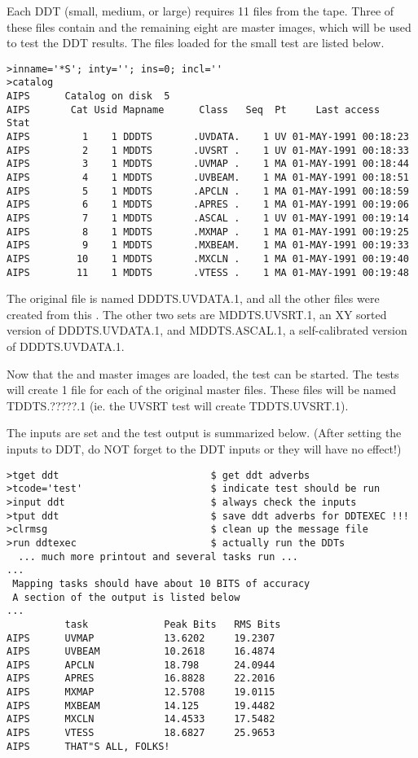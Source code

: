 Each DDT (small, medium, or large) requires 11 files from
the tape.  Three of these files contain \uvdata and the remaining
eight are master images, which will be used to test the DDT results.
The files loaded for the small test are listed below.
\begin{verbatim}
>inname='*S'; inty=''; ins=0; incl=''
>catalog
AIPS      Catalog on disk  5
AIPS       Cat Usid Mapname      Class   Seq  Pt     Last access      Stat
AIPS         1    1 DDDTS       .UVDATA.    1 UV 01-MAY-1991 00:18:23
AIPS         2    1 MDDTS       .UVSRT .    1 UV 01-MAY-1991 00:18:33
AIPS         3    1 MDDTS       .UVMAP .    1 MA 01-MAY-1991 00:18:44
AIPS         4    1 MDDTS       .UVBEAM.    1 MA 01-MAY-1991 00:18:51
AIPS         5    1 MDDTS       .APCLN .    1 MA 01-MAY-1991 00:18:59
AIPS         6    1 MDDTS       .APRES .    1 MA 01-MAY-1991 00:19:06
AIPS         7    1 MDDTS       .ASCAL .    1 UV 01-MAY-1991 00:19:14
AIPS         8    1 MDDTS       .MXMAP .    1 MA 01-MAY-1991 00:19:25
AIPS         9    1 MDDTS       .MXBEAM.    1 MA 01-MAY-1991 00:19:33
AIPS        10    1 MDDTS       .MXCLN .    1 MA 01-MAY-1991 00:19:40
AIPS        11    1 MDDTS       .VTESS .    1 MA 01-MAY-1991 00:19:48
\end{verbatim}
The original \uvdata file is named DDDTS.UVDATA.1, and all the other
files were created from this \uvdata.
The other two \uvdata sets are MDDTS.UVSRT.1, an XY sorted version
of DDDTS.UVDATA.1, and MDDTS.ASCAL.1, a self-calibrated version
of DDDTS.UVDATA.1.

Now that the \uvdata and master images are loaded, the test
can be started.  The tests will create 1 file for each of the
original master files.  These files will be named TDDTS.?????.1
(ie. the UVSRT test will create TDDTS.UVSRT.1).

\clearpage

The inputs are set and the test output is summarized below.
(After setting the inputs to DDT, do NOT forget to 
the DDT inputs or they will have no effect!)

\begin{verbatim}
>tget ddt                          $ get ddt adverbs
>tcode='test'                      $ indicate test should be run
>input ddt                         $ always check the inputs
>tput ddt                          $ save ddt adverbs for DDTEXEC !!!
>clrmsg                            $ clean up the message file
>run ddtexec                       $ actually run the DDTs
  ... much more printout and several tasks run ...
...
 Mapping tasks should have about 10 BITS of accuracy
 A section of the output is listed below
...
          task             Peak Bits   RMS Bits
AIPS      UVMAP            13.6202     19.2307
AIPS      UVBEAM           10.2618     16.4874
AIPS      APCLN            18.798      24.0944
AIPS      APRES            16.8828     22.2016
AIPS      MXMAP            12.5708     19.0115
AIPS      MXBEAM           14.125      19.4482
AIPS      MXCLN            14.4533     17.5482
AIPS      VTESS            18.6827     25.9653
AIPS      THAT"S ALL, FOLKS!
\end{verbatim}


